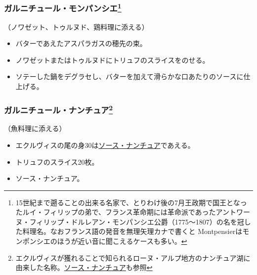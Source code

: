 \begin{recette}
\hypertarget{garniture-montpensier}{%
\subsubsection[ガルニチュール・モンパンシエ]{\texorpdfstring{ガルニチュール・モンパンシエ\footnote{15世紀まで遡ることの出来る名家で、とりわけ後の7月王政期で国王となったルイ・フィリップの弟で、フランス革命期には革命派であったアントワーヌ・フィリップ・ドルレアン・モンパンシエ公爵（1775〜1807）の名を冠した料理名。なおフランス語の発音を無理矢理カナで書くと
  Montpensierはモンポンシエのほうが近い音に聞こえるケースも多い。}}{ガルニチュール・モンパンシエ}}\label{garniture-montpensier}}



（ノワゼット、トゥルヌド、鶏料理に添える）

\begin{itemize}
\item
  バターであえたアスパラガスの穂先の束。
\item
  ノワゼットまたはトゥルヌドにトリュフのスライスをのせる。
\item
  ソテーした鍋をデグラセし、バターを加えて滑らかな口あたりのソースに仕上げる。
\end{itemize}

\hypertarget{garniture-nantua}{%
\subsubsection[ガルニチュール・ナンチュア]{\texorpdfstring{ガルニチュール・ナンチュア\footnote{エクルヴィスが獲れることで知られるローヌ・アルプ地方のナンチュア湖に由来した名称。\protect\hyperlink{sauce-nantua}{ソース・ナンチュア}も参照}}{ガルニチュール・ナンチュア}}\label{garniture-nantua}}



（魚料理に添える）

\begin{itemize}
\item
  エクルヴィスの尾の身30は\protect\hyperlink{sauce-nantua}{ソース・ナンチュア}であえる。
\item
  トリュフのスライス20枚。
\item
  ソース・ナンチュア。
\end{itemize}


\end{recette}
